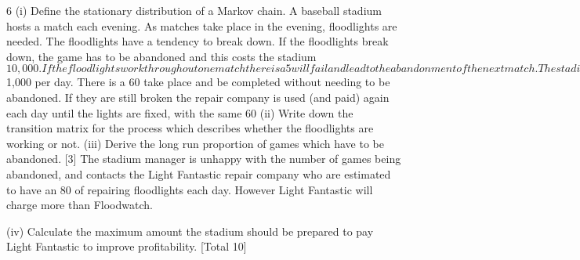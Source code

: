 




6 (i) Define the stationary distribution of a Markov chain. 
A baseball stadium hosts a match each evening. As matches take place in the
evening, floodlights are needed. The floodlights have a tendency to break down. If
the floodlights break down, the game has to be abandoned and this costs the stadium
$10,000. If the floodlights work throughout one match there is a 5%
will fail and lead to the abandonment of the next match.
The stadium has an arrangement with the Floodwatch repair company who are
brought in the morning after a floodlight breakdown and charge $1,000 per day. There
is a 60%
take place and be completed without needing to be abandoned. If they are still broken
the repair company is used (and paid) again each day until the lights are fixed, with
the same 60%
(ii) Write down the transition matrix for the process which describes whether the
floodlights are working or not. 
(iii) Derive the long run proportion of games which have to be abandoned. [3]
The stadium manager is unhappy with the number of games being abandoned, and
contacts the Light Fantastic repair company who are estimated to have an 80%
of repairing floodlights each day. However Light Fantastic will charge more than
Floodwatch.

(iv) Calculate the maximum amount the stadium should be prepared to pay Light
Fantastic to improve profitability. 
[Total 10]

